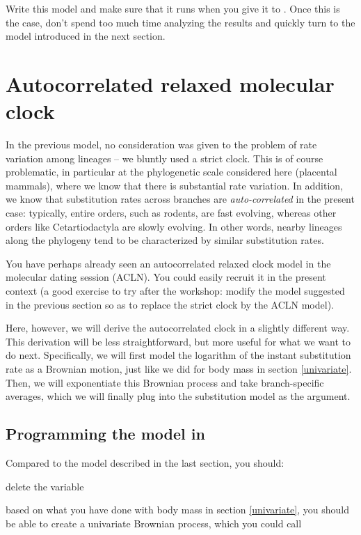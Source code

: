 Write this model and make sure that it runs when you give it to . Once this is the case, don't spend too much time analyzing the results and quickly turn to the model introduced in the next section.

\section{Autocorrelated relaxed molecular clock}

In the previous model, no consideration was given to the problem of rate variation among lineages --
we bluntly used a strict clock. This is of course problematic, in particular at the phylogenetic scale considered here (placental mammals), where we know that there is substantial rate variation. In addition, we know that substitution rates across branches are \emph{auto-correlated} in the present case: typically, entire orders, such as rodents, are fast evolving, whereas other orders like Cetartiodactyla are slowly evolving. In other words, nearby lineages along the phylogeny tend to be characterized by similar substitution rates.

You have perhaps already seen an autocorrelated relaxed clock model in the molecular dating session (ACLN). You could easily recruit it in the present context (a good exercise to try after the workshop: modify the model suggested in the previous section so as to replace the strict clock by the ACLN model).

Here, however, we will derive the autocorrelated clock in a slightly different way. This derivation will be less straightforward, but more useful for what we want to do next.
Specifically, we will first model the logarithm of the instant substitution rate as a Brownian motion, just like we did for body mass in section \ref{univariate}. Then, we will exponentiate this Brownian process and take branch-specific averages, which we will finally plug into the substitution model as the  argument.

\subsection{Programming the model in \RevBayes}

Compared to the model described in the last section, you should:


delete the  variable

based on what you have done with body mass in section \ref{univariate}, you should be able to create a univariate Brownian process, which you could call 

